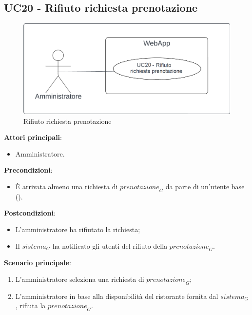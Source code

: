 \subsection{UC20 - Rifiuto richiesta prenotazione}\label{usecase:20}
\begin{figure}[H]
    \centering
    \includegraphics[width=0.9\linewidth]{ucd/ucd20.png}
    \caption{Rifiuto richiesta prenotazione}
\end{figure}
\textbf{Attori principali}:
\begin{itemize}
    \item Amministratore.
\end{itemize}
\textbf{Precondizioni}:
\begin{itemize}
     \item \`E arrivata almeno una richiesta di $\textit{prenotazione}_G$ da parte di un'utente base ().
\end{itemize}
\textbf{Postcondizioni}:
\begin{itemize}
    \item L'amministratore ha rifiutato la richiesta;
    \item Il $\textit{sistema}_G$ ha notificato gli utenti del rifiuto della $\textit{prenotazione}_G$.
\end{itemize}
\textbf{Scenario principale}:
\begin{enumerate}
    \item L'amministratore seleziona una richiesta di $\textit{prenotazione}_G$;
    \item L'amministratore in base alla disponibilità del ristorante fornita dal $\textit{sistema}_G$, rifiuta la $\textit{prenotazione}_G$.
\end{enumerate}
\newpage
